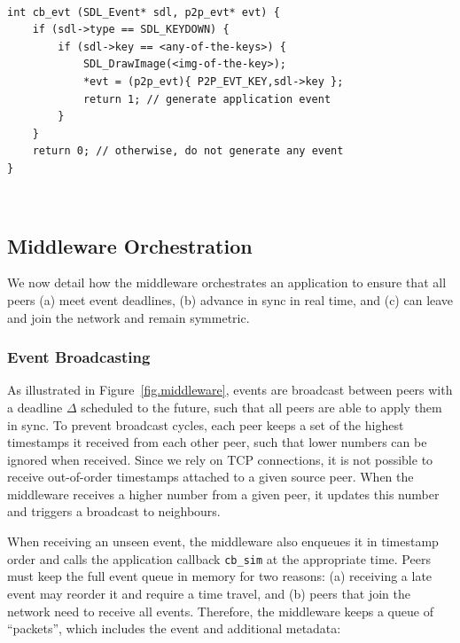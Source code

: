 \documentclass[10pt,journal,compsoc]{IEEEtran}
\newcommand{\code}[1]  {\texttt{\small{#1}}}
\begin{document}
{\footnotesize
~
\begin{verbatim}
int cb_evt (SDL_Event* sdl, p2p_evt* evt) {
    if (sdl->type == SDL_KEYDOWN) {
        if (sdl->key == <any-of-the-keys>) {
            SDL_DrawImage(<img-of-the-key>);
            *evt = (p2p_evt){ P2P_EVT_KEY,sdl->key };
            return 1; // generate application event
        }
    }
    return 0; // otherwise, do not generate any event
}
\end{verbatim}
~
}

\subsection{Middleware Orchestration}
\label{sec.tml.middleware}

We now detail how the middleware orchestrates an application to ensure that all
peers
    (a) meet event deadlines,
    (b) advance in sync in real time, and
    (c) can leave and join the network and remain symmetric.

\subsubsection{Event Broadcasting}
\label{sec.tml.middleware.events}

As illustrated in Figure~\ref{fig.middleware}, events are broadcast between
peers with a deadline $\Delta$ scheduled to the future, such that all peers are
able to apply them in sync.
%
To prevent broadcast cycles, each peer keeps a set of the highest timestamps it
received from each other peer, such that lower numbers can be ignored when
received.
Since we rely on TCP connections, it is not possible to receive out-of-order
timestamps attached to a given source peer.
When the middleware receives a higher number from a given peer, it updates this
number and triggers a broadcast to neighbours.
%

When receiving an unseen event, the middleware also enqueues it in timestamp
order and calls the application callback \code{cb\_sim} at the appropriate
time.
Peers must keep the full event queue in memory for two reasons:
    (a) receiving a late event may reorder it and require a time travel, and
    (b) peers that join the network need to receive all events.
%
Therefore, the middleware keeps a queue of ``packets'', which includes the
event and additional metadata:
\end{document}
